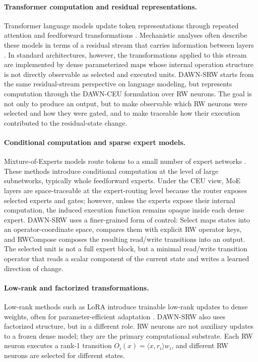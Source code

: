\documentclass{article}
\begin{document}
\paragraph{Transformer computation and residual representations.}
Transformer language models update token representations through repeated attention and feedforward transformations \cite{vaswani2017attention}. Mechanistic analyses often describe these models in terms of a residual stream that carries information between layers \cite{elhage2021mathematical}. In standard architectures, however, the transformations applied to this stream are implemented by dense parameterized maps whose internal operation structure is not directly observable as selected and executed units. DAWN-SRW starts from the same residual-stream perspective on language modeling, but represents computation through the DAWN-CEU formulation over RW neurons. The goal is not only to produce an output, but to make observable which RW neurons were selected and how they were gated, and to make traceable how their execution contributed to the residual-state change.

\paragraph{Conditional computation and sparse expert models.}
Mixture-of-Experts models route tokens to a small number of expert networks \cite{shazeer2017outrageously, fedus2022switch}. These methods introduce conditional computation at the level of large subnetworks, typically whole feedforward experts. Under the CEU view, MoE layers are space-traceable at the expert-routing level because the router exposes selected experts and gates; however, unless the experts expose their internal computation, the induced execution function remains opaque inside each dense expert. DAWN-SRW uses a finer-grained form of control: Select maps states into an operator-coordinate space, compares them with explicit RW operator keys, and RWCompose composes the resulting read/write transitions into an output. The selected unit is not a full expert block, but a minimal read/write transition operator that reads a scalar component of the current state and writes a learned direction of change.


\paragraph{Low-rank and factorized transformations.}
Low-rank methods such as LoRA introduce trainable low-rank updates to dense weights, often for parameter-efficient adaptation \cite{hu2022lora}. DAWN-SRW also uses factorized structure, but in a different role. RW neurons are not auxiliary updates to a frozen dense model; they are the primary computational substrate. Each RW neuron executes a rank-1 transition $O_i(x)=\langle x,r_i\rangle w_i$, and different RW neurons are selected for different states.
\end{document}
